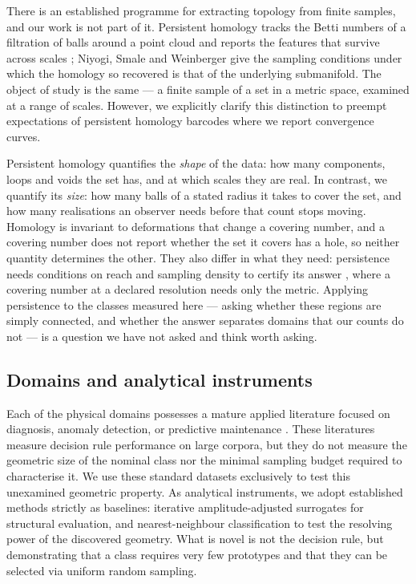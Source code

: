 \documentclass[10pt]{article}
\theoremstyle{plain}
\theoremstyle{definition}
\theoremstyle{remark}
\begin{document}
There is an established programme for extracting topology from finite samples,
and our work is not part of it. Persistent homology tracks the Betti numbers of
a filtration of balls around a point cloud and reports the features that
survive across scales \citep{carlsson2009topology, edelsbrunner2010computational,
chazal2021introduction}; Niyogi, Smale and Weinberger
\citet{niyogi2008finding} give the sampling conditions under which the homology
so recovered is that of the underlying submanifold. The object of study is the
same --- a finite sample of a set in a metric space, examined at a range of
scales. However, we explicitly clarify this distinction to preempt expectations
of persistent homology barcodes where we report convergence curves.

Persistent homology quantifies the \emph{shape} of the data: how many components, loops and voids
the set has, and at which scales they are real. In contrast, we quantify its \emph{size}:
how many balls of a stated radius it takes to cover the set, and how many
realisations an observer needs before that count stops moving. Homology is
invariant to deformations that change a covering number, and a covering number
does not report whether the set it covers has a hole, so neither quantity
determines the other. They also differ in what they need: persistence needs conditions on
reach and sampling density to certify its answer \citep{niyogi2008finding},
where a covering number at a declared resolution needs only the metric.
Applying persistence to the classes measured here --- asking whether these
regions are simply connected, and whether the answer separates domains that our
counts do not --- is a question we have not asked and think worth asking.

\subsection{Domains and analytical instruments}
\label{sec:rw-domains}

Each of the physical domains possesses a mature applied literature focused on diagnosis, anomaly detection, or predictive maintenance \citep{li2020pointmachine, MITBIH_dataset_1980, saha2007prognostics}. These literatures measure decision rule performance on large corpora, but they do not measure the geometric size of the nominal class nor the minimal sampling budget required to characterise it. We use these standard datasets exclusively to test this unexamined geometric property. As analytical instruments, we adopt established methods strictly as baselines: iterative amplitude-adjusted surrogates \citep{schreiber1996improved} for structural evaluation, and nearest-neighbour classification \citep{cover1967nearest} to test the resolving power of the discovered geometry. What is novel is not the decision rule, but demonstrating that a class requires very few prototypes and that they can be selected via uniform random sampling.
\end{document}
